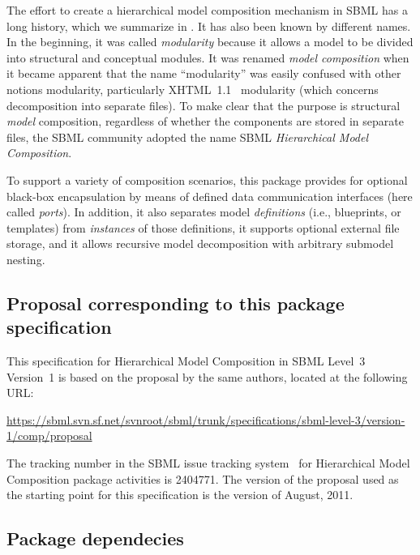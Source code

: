 The effort to create a hierarchical model composition mechanism in SBML
has a long history, which we summarize in .  It has
also been known by different names.  In the beginning, it was called
\emph{modularity} because it allows a model to be divided into
structural and conceptual modules.  It was renamed \emph{model
  composition} when it became apparent that the name ``modularity'' was
easily confused with other notions modularity, particularly
XHTML~1.1~\citep{xhtml} modularity (which concerns decomposition into
separate files).  To make clear that the purpose is structural
\emph{model} composition, regardless of whether the components are
stored in separate files, the SBML community adopted the name SBML
\emph{Hierarchical Model Composition}.

To support a variety of composition scenarios, this package provides for
optional black-box encapsulation by means of defined data communication
interfaces (here called \emph{ports}).  In addition, it also separates
model \emph{definitions} (i.e., blueprints, or templates) from
\emph{instances} of those definitions, it supports optional external
file storage, and it allows recursive model decomposition with arbitrary
submodel nesting.


\subsection{Proposal corresponding to this package specification}

This specification for Hierarchical Model Composition in SBML Level~3
Version~1 is based on the proposal by the same authors, located at the
following URL:

\begin{center}
  \vspace*{1ex}\small
  \url{https://sbml.svn.sf.net/svnroot/sbml/trunk/specifications/sbml-level-3/version-1/comp/proposal}
  \vspace*{1ex}
\end{center}

The tracking number in the SBML issue tracking system~\citep{tracker}
for Hierarchical Model Composition package activities is 2404771.  The
version of the proposal used as the starting point for this
specification is the version of August, 2011.


\subsection{Package dependecies}

